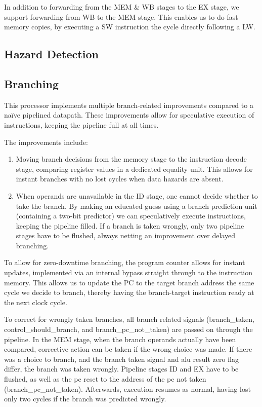 In addition to forwarding from the MEM \& WB stages to the EX stage, we support forwarding from WB to the MEM stage.
This enables us to do fast memory copies, by executing a SW instruction the cycle directly following a LW.

\subsection {Hazard Detection}

\subsection{Branching}

This processor implements multiple branch-related improvements compared to a naïve pipelined datapath. These improvements allow for speculative execution of instructions, keeping the pipeline full at all times.

The improvements include:
\begin{enumerate}
  \item
    Moving branch decisions from the memory stage to the instruction decode stage, comparing register values in a dedicated equality unit.
    This allows for instant branches with no lost cycles when data hazards are absent.
  \item
    When operands are unavailable in the ID stage, one cannot decide whether to take the branch.
    By making an educated guess using a branch prediction unit (containing a two-bit predictor) we can speculatively execute instructions, keeping the pipeline filled.
    If a branch is taken wrongly, only two pipeline stages have to be flushed, always netting an improvement over delayed branching.
\end{enumerate}

To allow for zero-downtime branching, the program counter allows for instant updates, implemented via an internal bypass straight through to the instruction memory.
This allows us to update the PC to the target branch address the same cycle we decide to branch, thereby having the branch-target instruction ready at the next clock cycle.

To correct for wrongly taken branches, all branch related signals (branch\_taken, control\_should\_branch, and branch\_pc\_not\_taken) are passed on through the pipeline.
In the MEM stage, when the branch operands actually have been compared, corrective action can be taken if the wrong choice was made.
If there was a choice to branch, and the branch taken signal and alu result zero flag differ, the branch was taken wrongly.
Pipeline stages ID and EX have to be flushed, as well as the pc reset to the address of the pc not taken (branch\_pc\_not\_taken).
Afterwards, execution resumes as normal, having lost only two cycles if the branch was predicted wrongly.

